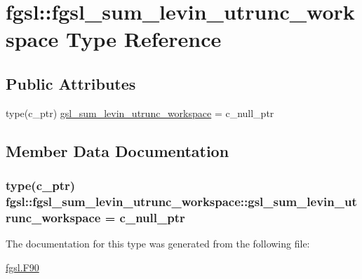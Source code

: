 \hypertarget{structfgsl_1_1fgsl__sum__levin__utrunc__workspace}{}\section{fgsl\+:\+:fgsl\+\_\+sum\+\_\+levin\+\_\+utrunc\+\_\+workspace Type Reference}
\label{structfgsl_1_1fgsl__sum__levin__utrunc__workspace}
\subsection*{Public Attributes}
\begin{DoxyCompactItemize}
\item 
type(c\+\_\+ptr) \hyperlink{structfgsl_1_1fgsl__sum__levin__utrunc__workspace_a0be7a408bfe2c998883c74a9b3285c5f}{gsl\+\_\+sum\+\_\+levin\+\_\+utrunc\+\_\+workspace} = c\+\_\+null\+\_\+ptr
\end{DoxyCompactItemize}


\subsection{Member Data Documentation}
\hypertarget{structfgsl_1_1fgsl__sum__levin__utrunc__workspace_a0be7a408bfe2c998883c74a9b3285c5f}{}
\subsubsection[{gsl\+\_\+sum\+\_\+levin\+\_\+utrunc\+\_\+workspace}]{\setlength{\rightskip}{0pt plus 5cm}type(c\+\_\+ptr) fgsl\+::fgsl\+\_\+sum\+\_\+levin\+\_\+utrunc\+\_\+workspace\+::gsl\+\_\+sum\+\_\+levin\+\_\+utrunc\+\_\+workspace = c\+\_\+null\+\_\+ptr}\label{structfgsl_1_1fgsl__sum__levin__utrunc__workspace_a0be7a408bfe2c998883c74a9b3285c5f}


The documentation for this type was generated from the following file\+:\begin{DoxyCompactItemize}
\item 
\hyperlink{fgsl_8F90}{fgsl.\+F90}\end{DoxyCompactItemize}

